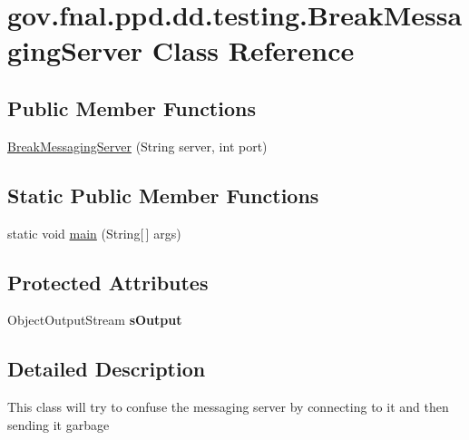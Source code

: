 \hypertarget{classgov_1_1fnal_1_1ppd_1_1dd_1_1testing_1_1BreakMessagingServer}{\section{gov.\-fnal.\-ppd.\-dd.\-testing.\-Break\-Messaging\-Server Class Reference}
\label{classgov_1_1fnal_1_1ppd_1_1dd_1_1testing_1_1BreakMessagingServer}
}
\subsection*{Public Member Functions}
\begin{DoxyCompactItemize}
\item 
\hyperlink{classgov_1_1fnal_1_1ppd_1_1dd_1_1testing_1_1BreakMessagingServer_aef289d13e4c16b990a173be32a0cc506}{Break\-Messaging\-Server} (String server, int port)
\end{DoxyCompactItemize}
\subsection*{Static Public Member Functions}
\begin{DoxyCompactItemize}
\item 
static void \hyperlink{classgov_1_1fnal_1_1ppd_1_1dd_1_1testing_1_1BreakMessagingServer_a8aa6fbbd0cac2e37fa6fe67bbaee2564}{main} (String\mbox{[}$\,$\mbox{]} args)
\end{DoxyCompactItemize}
\subsection*{Protected Attributes}
\begin{DoxyCompactItemize}
\item 
\hypertarget{classgov_1_1fnal_1_1ppd_1_1dd_1_1testing_1_1BreakMessagingServer_aeff2442403affcc30151d44d1157f35a}{Object\-Output\-Stream {\bfseries s\-Output}}\label{classgov_1_1fnal_1_1ppd_1_1dd_1_1testing_1_1BreakMessagingServer_aeff2442403affcc30151d44d1157f35a}

\end{DoxyCompactItemize}


\subsection{Detailed Description}
This class will try to confuse the messaging server by connecting to it and then sending it garbage

